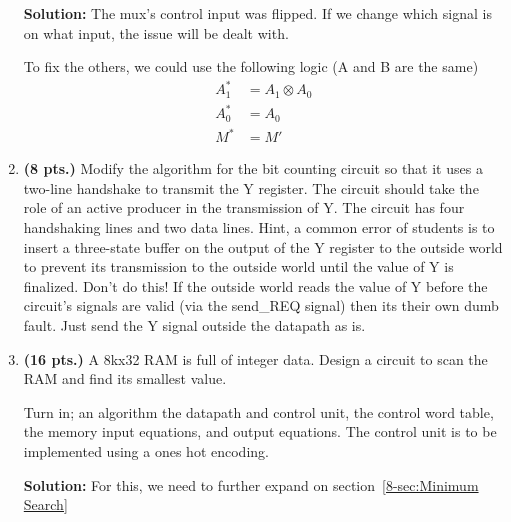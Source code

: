 \begin{enumerate}
        \begin{onlysolution} \textbf{Solution: }
            The mux's control input was flipped. If we change which signal is on what input, the issue will be dealt with.

            To fix the others, we could use the following logic (A and B are the same)
            \begin{align*}
                A_1^* & = A_1 \otimes A_0 \\
                A_0^* & = A_0             \\
                M^*   & = M'
            \end{align*}
        \end{onlysolution}
    \item \textbf{ (8 pts.)}
        Modify the algorithm for the bit counting circuit so that it uses a
        two-line handshake to transmit the Y register.  The circuit should take
        the role of an active producer in the transmission of Y.  The circuit
        has four handshaking lines and two data lines.  Hint, a common
        error of students is to insert a three-state buffer on the output of
        the Y register to the outside world to prevent its transmission to
        the outside world until the value of Y is finalized.  Don't do this!
        If the outside world reads the value of Y before the circuit's signals
        are valid (via the send\_REQ signal) then its their own dumb fault.
        Just send the Y signal outside the datapath as is.

    \item \textbf{ (16 pts.)}
        A 8kx32 RAM is full of integer data.  Design a circuit to scan
        the RAM and find its smallest value.

        Turn in; an algorithm the datapath and control unit, the control word
        table, the memory input equations, and output equations.
        The control unit is to be implemented using a ones hot encoding.

        \begin{onlysolution}[fragile] \textbf{Solution: }
            For this, we need to further expand on section~\ref{8-sec:Minimum Search}


\end{onlysolution}
\end{enumerate}
